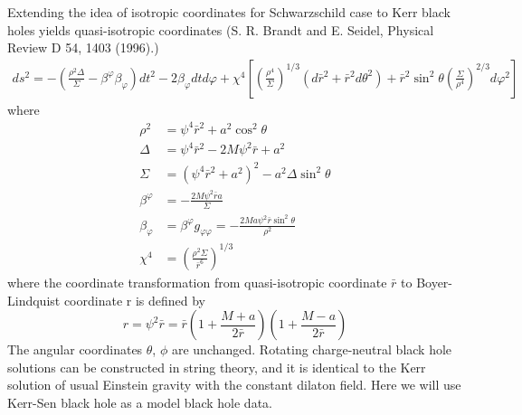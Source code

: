 \documentclass[prd]{revtex4}
\begin{document}
Extending the idea of isotropic coordinates for Schwarzschild case to Kerr black holes yields quasi-isotropic coordinates (S. R. Brandt and E. Seidel, Physical Review D 54, 1403 (1996).)
\begin{align}
ds^2 = - \left(\frac{\rho^2 \Delta}{\Sigma} - \beta^{\varphi} \beta_{\varphi} \right) dt^2 - 2 \beta_{\varphi} dt d\varphi + \chi^4 \left[ \left(\frac{\rho^4}{\Sigma} \right)^{1/3} (d \bar{r}^2 + \bar{r}^2 d \theta^2) + \bar{r}^2 \sin^2 \theta \left(\frac{\Sigma}{\rho^4} \right)^{2/3} d \varphi^2 \right]
\end{align}
where
\begin{align}
\rho^2 &= \psi^4 \bar{r}^2 + a^2 \cos^2 \theta \\
\Delta &= \psi^4 \bar{r}^2 - 2 M \psi^2 \bar{r} + a^2 \\
\Sigma &=(\psi^4 \bar{r}^2 + a^2)^2 - a^2 \Delta \sin^2 \theta \\
\beta^{\varphi} & = - \frac{2 M \psi^2 \bar{r} a}{\Sigma} \\
\beta_{\varphi} &= \beta^\varphi g_{\varphi \varphi} = -\frac{2 M a \psi^2 \bar{r} \sin^2 \theta}{\rho^2} \\
\chi^4 &= \left(\frac{\rho^2 \Sigma}{\bar{r}^6} \right)^{1/3}
\end{align}
where the coordinate transformation from quasi-isotropic coordinate $\bar{r}$ to Boyer-Lindquist coordinate r is defined by
\begin{equation}
\label{eqn:iso}
r = \psi^2 \bar{r} = \bar{r} \left(1+\frac{M+a}{2 \bar{r}} \right) \left(1+\frac{M-a}{2 \bar{r}} \right)
\end{equation}
The angular coordinates $\theta$, $\phi$ are unchanged. 
Rotating charge-neutral black hole solutions can be constructed in string theory, and it is identical to the Kerr solution of usual Einstein gravity with the constant dilaton field. Here we will use Kerr-Sen black hole as a model black hole data.
\end{document}

